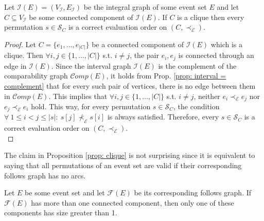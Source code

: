 \begin{proposition}\label{prop: clique}
Let $\mathcal{I}(E)=(V_{\mathcal{I}},E_{\mathcal{I}})$ be the integral graph of some event set $E$ and let $C \subseteq V_{\mathcal{I}}$ be some connected component of $\mathcal{I}(E)$.
If $C$ is a clique then every permutation $s \in \mathcal{S}_C$ is a correct evaluation order on $(C,\prec_{\mathcal{E}})$.
\end{proposition}

\begin{proof} 
Let $C=\{e_1,...,e_{|C|}\}$ be a connected component of $\mathcal{I}(E)$ which is a clique.
Then $\forall i,j \in \{1,...,|C|\}$ s.t. $i\neq j$, the pair $e_i, e_j$ is connected through an edge in $\mathcal{I}(E)$.
Since the interval graph $\mathcal{I}(E)$ is the complement of the comparability graph $\mathcal{C}omp(E)$, it holds from Prop. \ref{prop: interval = complement} that for every such pair of vertices, there is no edge between them in $\mathcal{C}omp(E)$.
This implies that $\forall i,j \in \{1,...,|C|\}$ s.t. $i \neq j$, neither $e_i \prec_{\mathcal{E}} e_j$ nor $e_j \prec_{\mathcal{E}} e_i$ hold.
This way, for every permutation $s \in \mathcal{S}_C$, the condition
$\forall ~ 1 \leq i < j \leq |s|: ~ s[j] \not \prec_{\mathcal{E}} s[i]$ is always satisfied.
Therefore, every $s \in \mathcal{S}_C$ is a correct evaluation order on $(C, \prec_{\mathcal{E}})$. \\ 
\end{proof}

The claim in Proposition \ref{prop: clique} is not surprising since it is equivalent to saying that all permutations of an event set are valid if their corresponding follows graph has no arcs.




\begin{proposition}\label{prop: component size}
Let $E$ be some event set and let $\mathcal{F}(E)$ be its corresponding follows graph.
If $\mathcal{F}(E)$ has more than one connected component, then only one of these components has size greater than 1.
\end{proposition}


